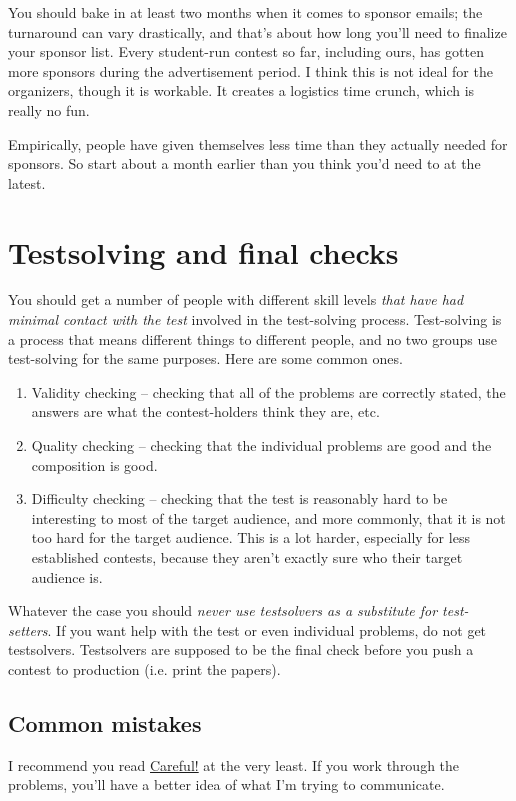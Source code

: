 \documentclass[points=false]{bounce}
\begin{document}
You should bake in at least two months when it comes to sponsor emails; the turnaround can vary drastically, and that's about how long you'll need to finalize your sponsor list.
Every student-run contest so far, including ours, has gotten more sponsors during the advertisement period.
I think this is not ideal for the organizers, though it is workable. It creates a logistics time crunch, which is really no fun.

Empirically, people have given themselves less time than they actually needed for sponsors.
So start about a month earlier than you think you'd need to at the latest.

\section{Testsolving and final checks}

You should get a number of people with different skill levels \emph{that have had minimal contact with the test} involved in the test-solving process. Test-solving is a process that means different things to different people, and no two groups use test-solving for the same purposes. Here are some common ones.
\begin{enumerate}
    \item Validity checking -- checking that all of the problems are correctly stated, the answers are what the contest-holders think they are, etc.
    \item Quality checking -- checking that the individual problems are good and the composition is good.
    \item Difficulty checking -- checking that the test is reasonably hard to be interesting to most of the target audience, and more commonly, that it is not too hard for the target audience. This is a lot harder, especially for less established contests, because they aren't exactly sure who their target audience is. 
\end{enumerate}
Whatever the case you should \emph{never use testsolvers as a substitute for test-setters}. If you want help with the test or even individual problems, do not get testsolvers. Testsolvers are supposed to be the final check before you push a contest to production (i.e. print the papers).

\subsection{Common mistakes}
I recommend you read \href{https://www.dennisc.net/resources/careful.pdf}{Careful!} at the very least. If you work through the problems, you'll have a better idea of what I'm trying to communicate.
\end{document}
